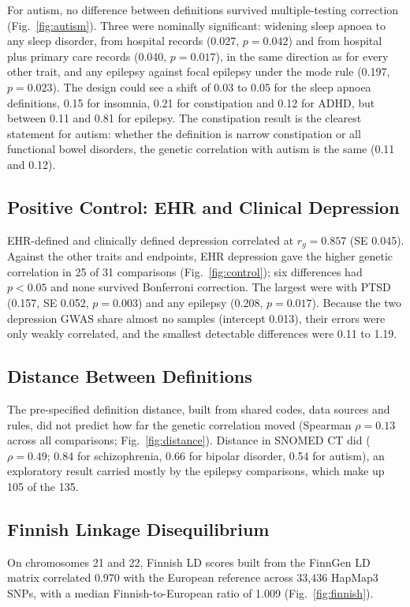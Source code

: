 \documentclass[conference]{IEEEtran}
\begin{document}
For autism, no difference between definitions survived multiple-testing correction (Fig.~\ref{fig:autism}). Three were nominally significant: widening sleep apnoea to any sleep disorder, from hospital records (0.027, $p = 0.042$) and from hospital plus primary care records (0.040, $p = 0.017$), in the same direction as for every other trait, and any epilepsy against focal epilepsy under the mode rule (0.197, $p = 0.023$). The design could see a shift of 0.03 to 0.05 for the sleep apnoea definitions, 0.15 for insomnia, 0.21 for constipation and 0.12 for ADHD, but between 0.11 and 0.81 for epilepsy. The constipation result is the clearest statement for autism: whether the definition is narrow constipation or all functional bowel disorders, the genetic correlation with autism is the same (0.11 and 0.12).

\subsection{Positive Control: EHR and Clinical Depression}






EHR-defined and clinically defined depression correlated at $r_g = 0.857$ (SE 0.045). Against the other traits and endpoints, EHR depression gave the higher genetic correlation in 25 of 31 comparisons (Fig.~\ref{fig:control}); six differences had $p < 0.05$ and none survived Bonferroni correction. The largest were with PTSD (0.157, SE 0.052, $p = 0.003$) and any epilepsy (0.208, $p = 0.017$). Because the two depression GWAS share almost no samples (intercept 0.013), their errors were only weakly correlated, and the smallest detectable differences were 0.11 to 1.19.

\subsection{Distance Between Definitions}


The pre-specified definition distance, built from shared codes, data sources and rules, did not predict how far the genetic correlation moved (Spearman $\rho = 0.13$ across all comparisons; Fig.~\ref{fig:distance}). Distance in SNOMED CT did ($\rho = 0.49$; 0.84 for schizophrenia, 0.66 for bipolar disorder, 0.54 for autism), an exploratory result carried mostly by the epilepsy comparisons, which make up 105 of the 135.

\subsection{Finnish Linkage Disequilibrium}
On chromosomes 21 and 22, Finnish LD scores built from the FinnGen LD matrix correlated 0.970 with the European reference across 33,436 HapMap3 SNPs, with a median Finnish-to-European ratio of 1.009 (Fig.~\ref{fig:finnish}).
\end{document}
